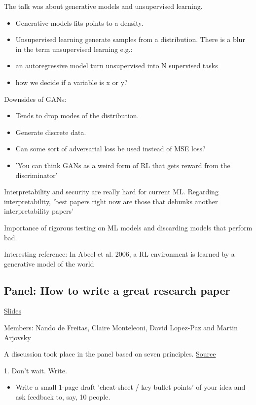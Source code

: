 \documentclass[12pt, english]{article}
\begin{document}
The talk was about generative models and unsupervised learning.
\begin{itemize}
\item Generative models fits points to a density.
\item Unsupervised learning generate samples from a distribution. There is a blur in the term unsupervised learning e.g.:
  \item an autoregressive model turn unsupervised into N supervised tasks
  \item how we decide if a variable is x or y?
  \end{itemize}

Downsides of GANs:
\begin{itemize}
\item Tends to drop modes of the distribution.
\item Generate discrete data.
\item Can some sort of adversarial loss be used instead of MSE loss?
\item 'You can think GANs as a weird form of RL that gets reward from the discriminator'
\end{itemize}

Interpretability and security are really hard for current ML. Regarding interpretability, 'best papers right now are those that debunks another interpretability papers'

Importance of rigorous testing on ML models and discarding models that perform bad.

Interesting reference: In Abeel et al. 2006, a RL environment is learned by a generative model of the world

\subsection{Panel: How to write a great research paper}
\href{https://drive.google.com/file/d/1Qc4NXeXJj-whjqmZIMjLr6RPbQOFgfnt/view?usp=sharing}{Slides}

Members: Nando de Freitas, Claire Monteleoni, David Lopez-Paz and Martin Arjovsky

A discussion took place in the panel based on seven principles. \href{https://www.cis.upenn.edu/~sweirich/icfp-plmw15/slides/peyton-jones.pdf}{Source}

1. Don't wait. Write.
\begin{itemize}
    \item Write a small 1-page draft 'cheat-sheet / key bullet points' of your idea and ask feedback to, say, 10 people.
    \end{itemize}
\end{document}
